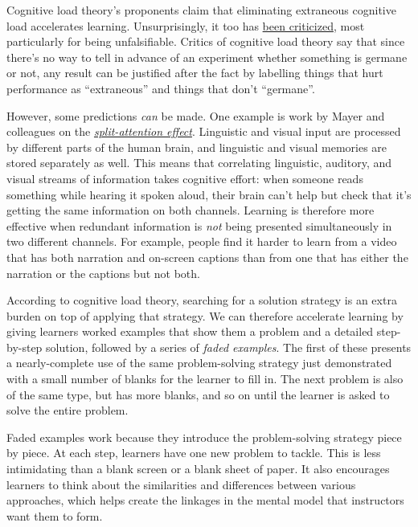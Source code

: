 Cognitive load theory's proponents claim that eliminating extraneous
cognitive load accelerates learning. Unsurprisingly, it too has
\href{https://edtechdev.wordpress.com/2009/11/16/cognitive-load-theory-failure/}{been
criticized}, most particularly for being unfalsifiable. Critics of
cognitive load theory say that since there's no way to tell in advance
of an experiment whether something is germane or not, any result can be
justified after the fact by labelling things that hurt performance as
``extraneous'' and things that don't ``germane''.

However, some predictions \emph{can} be made. One example is work by
Mayer and colleagues on the
\emph{\href{https://en.wikipedia.org/wiki/Split\_attention\_effect}{split-attention
effect}}. Linguistic and visual input are processed by different parts
of the human brain, and linguistic and visual memories are stored
separately as well. This means that correlating linguistic, auditory,
and visual streams of information takes cognitive effort: when someone
reads something while hearing it spoken aloud, their brain can't help
but check that it's getting the same information on both channels.
Learning is therefore more effective when redundant information is
\emph{not} being presented simultaneously in two different channels. For
example, people find it harder to learn from a video that has both
narration and on-screen captions than from one that has either the
narration or the captions but not both.


According to cognitive load theory, searching for a solution strategy is
an extra burden on top of applying that strategy. We can therefore
accelerate learning by giving learners worked examples that show them a
problem and a detailed step-by-step solution, followed by a series of
\emph{faded examples}. The first of these presents a nearly-complete use
of the same problem-solving strategy just demonstrated with a small
number of blanks for the learner to fill in. The next problem is also of
the same type, but has more blanks, and so on until the learner is asked
to solve the entire problem.

Faded examples work because they introduce the problem-solving strategy
piece by piece. At each step, learners have one new problem to tackle.
This is less intimidating than a blank screen or a blank sheet of paper.
It also encourages learners to think about the similarities and
differences between various approaches, which helps create the linkages
in the mental model that instructors want them to form.


